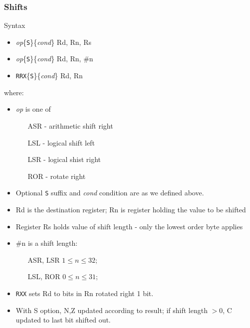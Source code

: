 \documentclass[10pt]{beamer}
\begin{document}
\begin{frame}
\frametitle{Shifts}
Syntax
\begin{itemize}
\item \textit{op}\{\texttt{S}\}\{\textit{cond}\} Rd, Rn, Rs
\item \textit{op}\{\texttt{S}\}\{\textit{cond}\} Rd, Rn, \#n
\item \texttt{RRX}\{\texttt{S}\}\{\textit{cond}\} Rd, Rn
\end{itemize}

where:
\begin{itemize}
\item \textit{op} is one of
  \begin{itemize}
  \item[ASR] - arithmetic shift right
  \item[LSL] - logical shift left
  \item[LSR] - logical shist right
  \item[ROR] - rotate right
  \end{itemize}
\item Optional \texttt{S} suffix and \textit{cond} condition are as we defined above.
\item Rd is the destination register; Rn is register holding the value to be shifted
\item Register Rs holds value of shift length - only the lowest order byte applies
\item \#n is a shift length:
  \begin{itemize}
  \item[ASR, LSR] $1 \le n \le 32$; 
  \item[LSL, ROR] $0 \le n \le 31$;
  \end{itemize}
\item \texttt{RXX} sets Rd to bits in Rn rotated right 1 bit.
\item With S option, N,Z updated according to result; if shift length $> 0$, C updated to last bit shifted out.
\end{itemize}
\end{frame}
\end{document}
